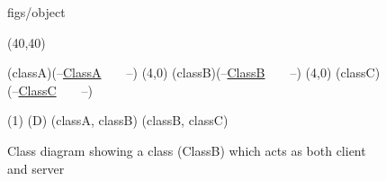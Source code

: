 





\begin {figure}


\Draw

 {figs/object}

\MinNodeSize(40,40)

\RectNode (classA)(--\underline {ClassA}~~~~--)
\MoveToExit(4,0)
\RectNode (classB)(--\underline {ClassB}~~~~--)
\MoveToExit(4,0)
\RectNode (classC)(--\underline {ClassC}~~~~--)

\ArrowHeads(1)
\EdgeSpec (D)
\Edge(classA, classB)
\Edge(classB, classC)

\EndDraw

\caption {Class diagram showing a class (ClassB) which acts
as both client and server}

\label {fig:clientServerABC}

\end {figure}



